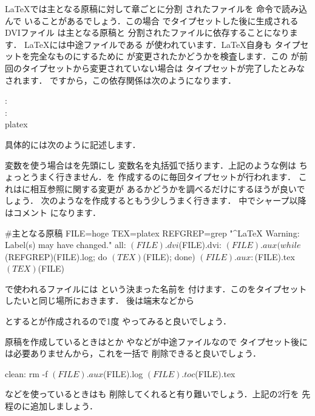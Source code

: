 {\LaTeX}では主となる原稿に対して章ごとに分割
されたファイルを 命令で読み込んで
いることがあるでしょう．この場合\prog{\LaTeX}
でタイプセットした後に生成されるDVIファイル
は主となる原稿と
分割されたファイルに依存することになります．
{\LaTeX}には中途ファイルである
が使われています．{\LaTeX}自身も
タイプセットを完全なものにするために
が変更されたかどうかを検査します．この
が前回のタイプセットから変更されていない場合は
タイプセットが完了したとみなされます．
ですから，この依存関係は次のようになります．
\begin{Syntax}
: \\
: \\
\MakeTabSkip platex 
\end{Syntax}
具体的には次のように記述します．
変数を使う場合は\qu{\texttt{\$}}を先頭にし
変数名を丸括弧で括ります．上記のような例は
ちょっとうまく行きません．を
作成するのに毎回タイプセットが行われます．
これはに相互参照に関する変更が
あるかどうかを調べるだけにするほうが良いでしょう．
次のようなを作成するともう少しうまく行きます．
中でシャープ\qu{\str{#}}以降はコメント
になります．
\begin{Makefile}
#主となる原稿
FILE=hoge
TEX=platex
REFGREP=grep "^LaTeX Warning: Label(s) may have changed."
all: $(FILE).dvi
$(FILE).dvi: $(FILE).aux
	(while $(REFGREP)$ $(FILE).log; do $(TEX) $(FILE); done)
$(FILE).aux: $(FILE).tex
	$(TEX) $(FILE)
\end{Makefile}
で使われるファイルには
という決まった名前を
付けます．このをタイプセット
したいと同じ場所におきます．
後は端末などから
\begin{InTerm}
\end{InTerm}
とするとが作成されるので1度
やってみると良いでしょう．

原稿を作成しているときはとか
やなどが中途ファイルなので
タイプセット後には必要ありませんから，これを一括で
削除できると良いでしょう．
\begin{Makefile}
clean:	
	rm -f $(FILE).aux $(FILE).log $(FILE).toc $(FILE).tex~
\end{Makefile}
などを使っているときはも
削除してくれると有り難いでしょう．上記の2行を
先程のに追加しましょう．

